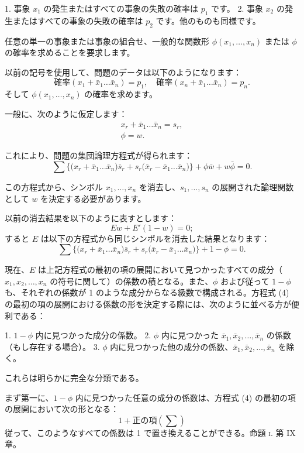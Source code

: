 \documentclass[a4paper,11pt,openany]{ltjsbook}
\begin{document}
1. 事象 $x_1$ の発生またはすべての事象の失敗の確率は $p_1$ です。
2. 事象 $x_2$ の発生またはすべての事象の失敗の確率は $p_2$ です。他のものも同様です。

任意の単一の事象または事象の組合せ、一般的な関数形 $\phi(x_1, \dotsc, x_n)$ または $\phi$ の確率を求めることを要求します。

以前の記号を使用して、問題のデータは以下のようになります：
\[
  \text{確率} (x_1 + \bar{x}_1 \dotsc \bar{x}_n) = p_1, \quad
  \text{確率} (x_n + \bar{x}_1 \dotsc \bar{x}_n) = p_n.
\]
そして $\phi(x_1, \dotsc, x_n)$ の確率を求めます。

一般に、次のように仮定します：
\begin{gather*}
  x_r + \bar{x}_1 \dotsc \bar{x}_n = s_r,    \tag{1}   \\
  \phi = w.                            \tag{2}
\end{gather*}

これにより、問題の集団論理方程式が得られます：
\[
  \sum \bigl\{\bigl( x_r + \bar{x}_1 \dotsc \bar{x}_n \bigr)\bar{s}_r
    + s_r \bigl( \bar{x}_r - \bar{x}_1 \dotsc \bar{x}_n \bigr)\bigr\}
  + \phi\bar{w} + w\bar{\phi} = 0.  \tag{3}
\]

この方程式から、シンボル $x_1, \dotsc, x_n$ を消去し、$s_1, \dotsc, s_n$ の展開された論理関数として $w$ を決定する必要があります。

以前の消去結果を以下のように表すとします：
\[
  Ew + E'(1-w) = 0;
\]
すると $E$ は以下の方程式から同じシンボルを消去した結果となります：
\[
  \sum \bigl\{\bigl( x_r + \bar{x}_1 \dotsc \bar{x}_n \bigr)\bar{s}_r
    + s_r \bigl( \bar{x}_r - \bar{x}_1 \dotsc \bar{x}_n \bigr)\bigr\}
  + 1 - \phi = 0.  \tag{4}
\]

現在、$E$ は上記方程式の最初の項の展開において見つかったすべての成分（$x_1, x_2, \ldots, x_n$ の符号に関して）の係数の積となる。また、$\phi$ および従って $1 - \phi$ も、それぞれの係数が 1 のような成分からなる級数で構成される。方程式 (4) の最初の項の展開における係数の形を決定する際には、次のように並べる方が便利である：

1. $1 - \phi$ 内に見つかった成分の係数。
2. $\phi$ 内に見つかった $\bar{x}_1, \bar{x}_2, \ldots, \bar{x}_n$ の係数（もし存在する場合）。
3. $\phi$ 内に見つかった他の成分の係数、$\bar{x}_1, \bar{x}_2, \ldots, \bar{x}_n$ を除く。

これらは明らかに完全な分類である。

まず第一に、$1 - \phi$ 内に見つかった任意の成分の係数は、方程式 (4) の最初の項の展開において次の形となる：
\[
  1 + \text{正の項}\left(\sum\right)
\]
従って、このようなすべての係数は 1 で置き換えることができる。命題 \textsc{i.} 第 IX 章。
\end{document}
